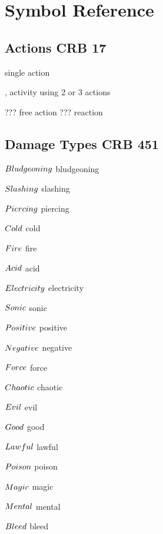 \documentclass[paper=63mm:88mm, DIV=21, fontsize=7.5pt]{scrartcl}
\begin{document}
\newcommand{\Reference}[2]{{\small \color{gray} \engschrift #1 #2}}

\newcommand{\Tag}[2]{%
    \tikz[baseline]{%
        \node[anchor=base, text=white, fill=#1, font=\sffamily, text depth=.5mm] {#2};
    }%
}


\newcommand{\Trait}[1]{\Tag{traitBg}{#1}}
\newcommand{\Rare}[0]{\Tag{rareBg}{Rare}}
\newcommand{\Uncommon}[0]{\Tag{uncommonBg}{Uncommon}}

\newcommand{\Traits}[1]{\colorbox{tagsBg}{#1}}

\section{Symbol Reference}

\subsection{Actions\hfill\Reference{CRB}{17}}

 single action 

,  activity using 2 or 3 actions

??? free action 
??? reaction

\subsection{Damage Types\hfill\Reference{CRB}{451}}

\begin{multicols}{3}
\footnotesize

\(\DamageType{Bludgeoning}\) bludgeoning

\(\DamageType{Slashing}\) slashing

\(\DamageType{Piercing}\) piercing

\(\DamageType{Cold}\) cold

\(\DamageType{Fire}\) fire

\(\DamageType{Acid}\) acid

\(\DamageType{Electricity}\) electricity

\(\DamageType{Sonic}\) sonic

\(\DamageType{Positive}\) positive

\(\DamageType{Negative}\) negative

\(\DamageType{Force}\) force

\(\DamageType{Chaotic}\) chaotic

\(\DamageType{Evil}\) evil

\(\DamageType{Good}\) good

\(\DamageType{Lawful}\) lawful

\(\DamageType{Poison}\) poison

\(\DamageType{Magic}\) magic

\(\DamageType{Mental}\) mental

\(\DamageType{Bleed}\) bleed

\end{multicols}
\end{document}
